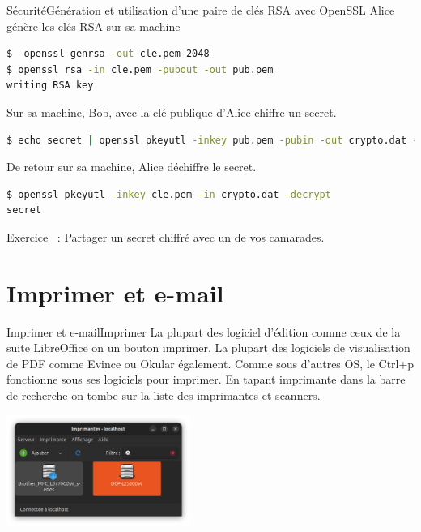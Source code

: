 \documentclass{beamer}
\begin{document}
    \begin{frame}[fragile]{Sécurité}{Génération et utilisation d'une paire de clés RSA avec OpenSSL}
        Alice génère les clés RSA sur sa machine
        \begin{lstlisting}[language=bash,basicstyle=\ttfamily\small]
$  openssl genrsa -out cle.pem 2048
$ openssl rsa -in cle.pem -pubout -out pub.pem
writing RSA key
        \end{lstlisting}
        Sur sa machine, Bob, avec la clé publique d'Alice chiffre un secret.
        \begin{lstlisting}[language=bash,basicstyle=\ttfamily\small]
$ echo secret | openssl pkeyutl -inkey pub.pem -pubin -out crypto.dat -encrypt
        \end{lstlisting}
        De retour sur sa machine, Alice déchiffre le secret.
        \begin{lstlisting}[language=bash,basicstyle=\ttfamily\small]
$ openssl pkeyutl -inkey cle.pem -in crypto.dat -decrypt
secret
        \end{lstlisting}
        Exercice \execcounterdispinc~:
        Partager un secret chiffré avec un de vos camarades.
    \end{frame}


    \section{Imprimer et e-mail}\label{sec:print-n-mail}

    \begin{frame}{Imprimer et e-mail}{Imprimer}
        La plupart des logiciel d'édition comme ceux de la suite LibreOffice on un bouton imprimer.
        La plupart des logiciels de visualisation de PDF comme Evince ou Okular également.
        \bigbreak
        Comme sous d'autres OS, le Ctrl+p fonctionne sous ses logiciels pour imprimer.
        \bigbreak
        En tapant imprimante dans la barre de recherche on tombe sur la liste des imprimantes et scanners.
        \begin{center}
            \includegraphics[width=6cm]{image/ubuntu-printers}
        \end{center}
    \end{frame}
\end{document}
